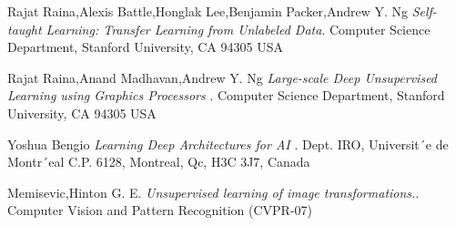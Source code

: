 \documentclass[18pt,letterpaper]{article}
\begin{document}
\begin{thebibliography}{9}

Rajat Raina,Alexis Battle,Honglak Lee,Benjamin Packer,Andrew Y. Ng
  \emph{Self-taught Learning: Transfer Learning from Unlabeled Data}. Computer Science Department, Stanford University, CA 94305 USA

Rajat Raina,Anand Madhavan,Andrew Y. Ng 
  \emph{Large-scale Deep Unsupervised Learning using Graphics Processors
}.
Computer Science Department, Stanford University, CA 94305 USA
  
  Yoshua Bengio
  \emph{Learning Deep Architectures for AI
}.
Dept. IRO, Universit´e de Montr´eal
C.P. 6128, Montreal, Qc, H3C 3J7, Canada

  Memisevic,Hinton G. E.
  \emph{Unsupervised learning of image transformations.}.
Computer Vision and Pattern Recognition (CVPR-07)


\end{thebibliography}
\end{document}
